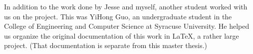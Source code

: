 \documentclass[../main/main.tex]{subfiles}
\begin{document}
In addition to the work done by Jesse and myself, another student worked with us on the project.  This was YiHong Guo, an undergraduate student in the College of Engineering and Computer Science at Syracuse University. He helped us organize the original documentation of this work in LaTeX, a rather large project. (That documentation is separate from this master thesis.)
\end{document}
